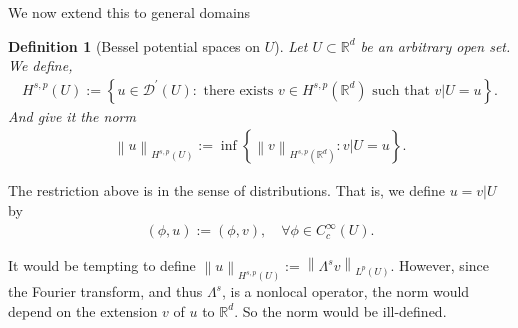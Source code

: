 \documentclass[
    a4paper,
    DIV=14,
    abstract=true,
    numbers=noenddot
]
{scrartcl}
\newtheorem{definition}[theorem]{Definition}
\theoremstyle{definition}
\newcommand{\set}[1]{\left\{#1\right\}}
\renewcommand{\norm}[1]{\left\lVert #1 \right\rVert}\renewcommand{\abs}[1]{\left| #1 \right|}
\newcommand\restr[2]{\left.#1\right|{#2}}
\newcommand{\R}{\mathbb{R}}
\begin{document}
We now extend this to general domains
\begin{definition}[Bessel potential spaces on $U$]\label{bessel potential def U}
    Let $U \subset \R^d$ be an arbitrary open set. We define,
    \begin{align*}
        H^{s,p}(U):=\left\{u \in \mathcal{D}^{\prime}(U): \text{ there exists } v \in H^{s,p}(\R^d) \text{ such that } \restr{v}{U}=u\right\}.
    \end{align*}
    And give it the norm
    \begin{align*}
        \norm{u}_{H^{s,p}(U)}:= \inf \set{\norm{v}_{H^{s,p}(\R^d)}: \restr{v}{U}=u}.
    \end{align*}
\end{definition}
The restriction above is in the sense of distributions. That is, we define $u=\restr{v}{U}$ by
\begin{align*}
    (\phi,u):=(\phi,v), \quad \forall \phi \in C_c^\infty(U).
\end{align*}

It would be tempting to define $\norm{u}_{H^{s,p}(U)}:=\norm{\Lambda^s v}_{L^p(U)}$. However, since the Fourier transform, and thus $\Lambda^s$, is a nonlocal operator, the norm would depend on the extension $v$  of $u$ to $\R^d$. So the norm would be ill-defined.
\end{document}
